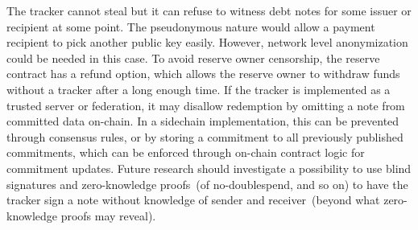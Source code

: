 \documentclass{ifcolog}
\begin{document}
The tracker cannot steal but it can refuse to witness debt notes for some issuer or recipient at some point. The pseudonymous nature
would allow a payment recipient to pick another public key easily. However, network level anonymization could be needed in this case.
To avoid reserve owner censorship, the reserve contract has a refund option, which allows the reserve owner to withdraw funds without a tracker after a long enough time.
If the tracker is implemented as a trusted server or federation, it may disallow redemption by omitting a note from committed data on-chain. In a sidechain
implementation, this can be prevented through consensus rules, or by storing a commitment to all previously published commitments, which can be enforced through on-chain contract logic for commitment updates.
Future research should investigate a possibility to use blind signatures and zero-knowledge proofs~(of no-doublespend, and so on) to have the tracker sign a note without knowledge of sender and receiver~(beyond what zero-knowledge proofs may reveal).




\end{document}
